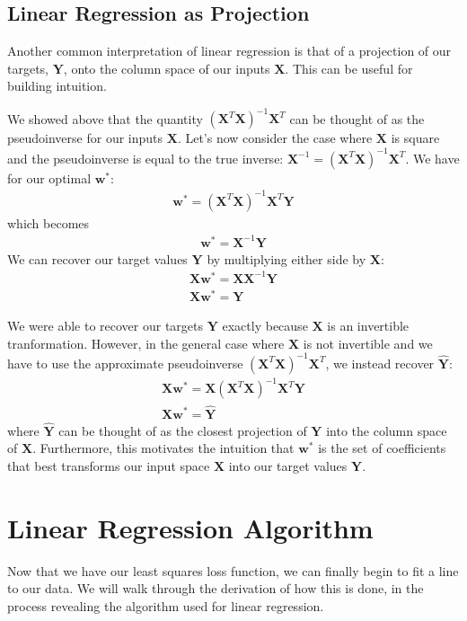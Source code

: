 \subsection{Linear Regression as Projection}
Another common interpretation of linear regression is that of a projection of our targets, $\textbf{Y}$, onto the column space of our inputs $\textbf{X}$. This can be useful for building intuition.

We showed above that the quantity $(\textbf{X}^{T}\textbf{X})^{-1}\textbf{X}^{T}$ can be thought of as the pseudoinverse for our inputs $\textbf{X}$. Let's now consider the case where $\textbf{X}$ is square and the pseudoinverse is equal to the true inverse: $\textbf{X}^{-1} = (\textbf{X}^{T}\textbf{X})^{-1}\textbf{X}^{T}$. We have for our optimal $\textbf{w}^{*}$:
\begin{align*}
    \textbf{w}^{*} = (\textbf{X}^{T}\textbf{X})^{-1}\textbf{X}^{T}\textbf{Y}
\end{align*}
which becomes
\begin{align*}
    \textbf{w}^{*} = \textbf{X}^{-1}\textbf{Y}
\end{align*}
We can recover our target values $\textbf{Y}$ by multiplying either side by $\textbf{X}$:
\begin{align*}
    \textbf{X}\textbf{w}^{*} = \textbf{X}\textbf{X}^{-1}\textbf{Y} \\
    \textbf{X}\textbf{w}^{*} = \textbf{Y}
\end{align*}

We were able to recover our targets $\textbf{Y}$ exactly because $\textbf{X}$ is an invertible tranformation. However, in the general case where $\textbf{X}$ is not invertible and we have to use the approximate pseudoinverse $(\textbf{X}^{T}\textbf{X})^{-1}\textbf{X}^{T}$, we instead recover $\hat{\textbf{Y}}$:
\begin{align*}
    \textbf{X}\textbf{w}^{*} = \textbf{X}(\textbf{X}^{T}\textbf{X})^{-1}\textbf{X}^{T}\textbf{Y} \\
    \textbf{X}\textbf{w}^{*} = \hat{\textbf{Y}}
\end{align*}
where $\hat{\textbf{Y}}$ can be thought of as the closest projection of $\textbf{Y}$ into the column space of $\textbf{X}$. Furthermore, this motivates the intuition that $\textbf{w}^{*}$ is the set of coefficients that best transforms our input space $\textbf{X}$ into our target values $\textbf{Y}$.

\section{Linear Regression Algorithm}
Now that we have our least squares loss function, we can finally begin to fit a line to our data. We will walk through the derivation of how this is done, in the process revealing the algorithm used for linear regression.


